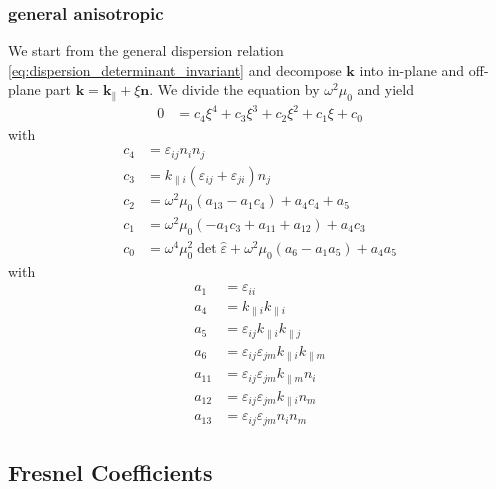 \documentclass[12pt,a4paper,twoside,openright,BCOR10mm,headsepline,titlepage,abstracton,chapterprefix,final]{scrreprt}
\newcommand\Vector[1]{{\mathbf{#1}}}
\newcommand\vacuum{0}
\newcommand\wavenumber{k}
\newcommand\Wavevector{\Vector{\wavenumber}}
\newcommand\Tensor[1]{\hat{#1}}
\newcommand\vacuumpermeability{\scalarpermeability_{\vacuum}}
\newcommand\scalarpermeability{\mu}
\newcommand\permittivity{\Tensor{\scalarpermittivity}}
\newcommand\scalarpermittivity{\varepsilon}
\newcommand{\kpa}[1]{{\wavenumber_{\parallel#1}}}
\begin{document}
\subsubsection{general anisotropic}\label{subsubsec:general_anisotropic_refraction}
We start from the general dispersion relation \eqref{eq:dispersion_determinant_invariant} and decompose $\Wavevector$ into in-plane and off-plane part
$\Wavevector = \Wavevector_\parallel + \xi \Vector{n}$.
We divide the equation by $\omega^2 \vacuumpermeability$ and yield
\begin{align}
0 &= c_4 \xi ^4 + c_3 \xi ^3 + c_2 \xi ^2 + c_1 \xi + c_0\label{eq:detequalszeroanisotropic}
\end{align}
with
\begin{align}
 c_4 &= \scalarpermittivity_{ij} n_i n_j \\
 c_3 &=  \kpa{i} (\scalarpermittivity_{ij}+\scalarpermittivity_{ji}) n_j \\
 c_2 &= \omega^2 \vacuumpermeability (a_{13}-a_1 c_4)+ a_4 c_4+a_5 \\
 c_1 &= \omega^2 \vacuumpermeability (-a_1 c_3 + a_{11}+a_{12})+a_4 c_3 \\
 c_0 &= \omega^4 \vacuumpermeability^2 \det\permittivity +\omega^2 \vacuumpermeability (a_6-a_1 a_5)+a_4 a_5
\end{align}
with
\begin{subequations}
\begin{align}
 a_1 &= \scalarpermittivity_{ii} \\
 a_4 &= \kpa{i}\kpa{i} \\
 a_5 &= \scalarpermittivity_{ij} \kpa{i} \kpa{j} \\
 a_6 &= \scalarpermittivity_{ij} \scalarpermittivity_{jm} \kpa{i}\kpa{m} \\
 a_{11} &= \scalarpermittivity_{ij} \scalarpermittivity_{jm} \kpa{m} n_i \\
 a_{12} &= \scalarpermittivity_{ij} \scalarpermittivity_{jm} \kpa{i} n_m \\
 a_{13} &= \scalarpermittivity_{ij} \scalarpermittivity_{jm} n_i n_m 
\end{align}
\end{subequations}



\subsection{Fresnel Coefficients}
\end{document}
